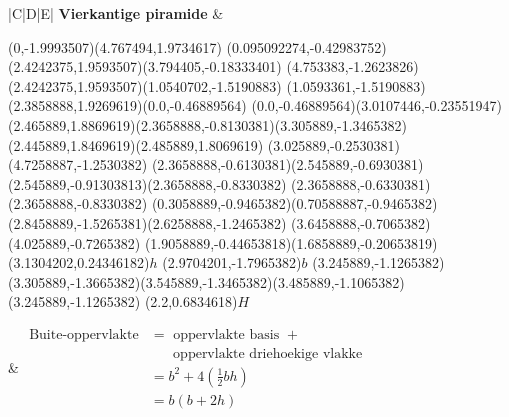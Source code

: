 \begin{table}[H]
\begin{tabular}{|C|D|E|}
\hline
\textbf{Vierkantige piramide}
&
\begin{center}

\scalebox{0.7} %
{
\begin{pspicture}(0,-1.9993507)(4.767494,1.9734617)
\pspolygon[linewidth=0.028222222,fillstyle=solid](0.095092274,-0.42983752)(2.4242375,1.9593507)(3.794405,-0.18333401)
\pspolygon[linewidth=0.028222222,fillstyle=solid](4.753383,-1.2623826)(2.4242375,1.9593507)(1.0540702,-1.5190883)
\pspolygon[linewidth=0.028222222,fillstyle=solid](1.0593361,-1.5190883)(2.3858888,1.9269619)(0.0,-0.46889564)
\psline[linewidth=0.022cm,linestyle=dashed,dash=0.16cm 0.16cm](0.0,-0.46889564)(3.0107446,-0.23551947)
\psline[linewidth=0.027999999,linestyle=dotted,dotsep=0.16cm](2.465889,1.8869619)(2.3658888,-0.8130381)(3.305889,-1.3465382)(2.445889,1.8469619)(2.485889,1.8069619)
\psline[linewidth=0.024cm,linestyle=dashed,dash=0.16cm 0.16cm](3.025889,-0.2530381)(4.7258887,-1.2530382)
\psline[linewidth=0.02](2.3658888,-0.6130381)(2.545889,-0.6930381)(2.545889,-0.91303813)(2.3658888,-0.8330382)
\psline[linewidth=0.02cm](2.3658888,-0.6330381)(2.3658888,-0.8330382)
\psline[linewidth=0.04cm](0.3058889,-0.9465382)(0.70588887,-0.9465382)
\psline[linewidth=0.04cm](2.8458889,-1.5265381)(2.6258888,-1.2465382)
\psline[linewidth=0.04cm](3.6458888,-0.7065382)(4.025889,-0.7265382)
\psline[linewidth=0.04cm](1.9058889,-0.44653818)(1.6858889,-0.20653819)
\rput(3.1304202,0.24346182){$h$}
\rput(2.9704201,-1.7965382){$b$}
\psline[linewidth=0.02](3.245889,-1.1265382)(3.305889,-1.3665382)(3.545889,-1.3465382)(3.485889,-1.1065382)(3.245889,-1.1265382)
\rput(2.2,0.6834618){$H$}
\end{pspicture} 
}
\end{center} 
&
$\begin{aligned}
\mbox{Buite-oppervlakte} &= \mbox{ oppervlakte basis } +\\
&~~~~~~\mbox{ oppervlakte driehoekige vlakke } \\
&=b^{2} + 4\left(\frac{1}{2}bh\right)\\
&=b(b+2h)
 \end{aligned}$
\\ \hline



\end{tabular}
\end{table}
